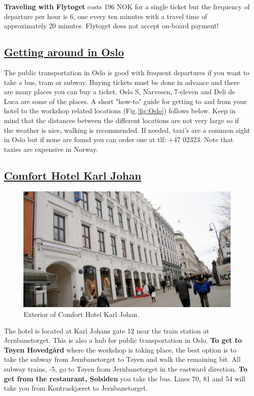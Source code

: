 \documentclass{article}
\begin{document}
\textbf{Traveling with Flytoget} costs 196 NOK for a single ticket but the frequency of
departure per hour is 6, one every ten minutes with a travel time of approximately 20
minutes. Flytoget does not accept on-board payment!


\subsection*{\underline{Getting around in Oslo}}

The public transportation in Oslo is good with frequent departures if you want
to take a bus, tram or subway. Buying tickets must be
done in advance and there are many places you can buy a
ticket. Oslo S, Narvesen, 7-eleven and Deli de Luca are some of the places.
A short "how-to" guide for getting to and from your hotel to the workshop related
locations (Fig.\ref{fig:Oslo}) follows below. Keep in mind that the distances
between the different locations are not very large so if the
weather is nice, walking is recommended. If needed, taxi's
are a common sight in Oslo but if none are found you can order one
at tlf: +47 02323. Note that taxies are expensive in Norway.


\subsection*{\underline{Comfort Hotel Karl Johan}}

\begin{figure}
\centering
\includegraphics[scale=0.2]{img/comfort_karl_johan.jpg}
\caption{\label{fig:frog1}Exterior of Comfort Hotel Karl Johan.}
\end{figure}
The hotel is located at Karl Johans gate 12 near the train station at Jernbanetorget.
This is also a hub for public transportation in Oslo. \textbf{To get to Tøyen Hovedgård}
where the workshop is taking place, the best option is to take the subway from Jernbanetorget
to Tøyen and walk the remaining bit.  All subway trains,
-5, go to Tøyen from Jernbanetorget in the eastward direction. \textbf{To get from
the restaurant, Solsiden} you take the bus. Lines 70, 81 and 54 will take you from Kontraskjæret to Jernbanetorget.
\end{document}
